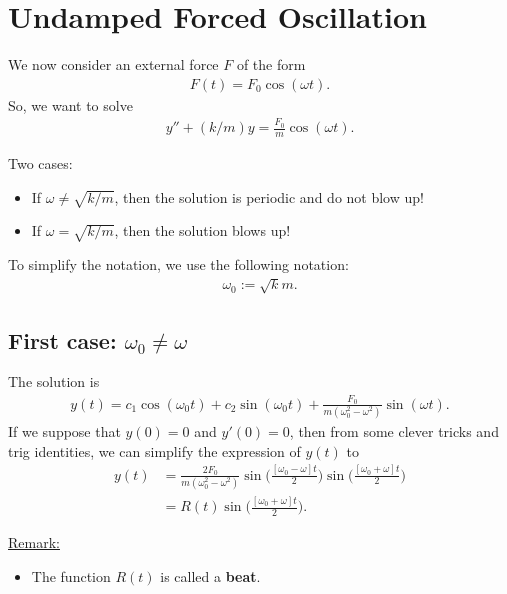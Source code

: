 \documentclass[12pt,a4paper]{article}
\begin{document}
\newpage

\section{Undamped Forced Oscillation}
We now consider an external force $F$ of the form
	\begin{align*}
	F(t) = F_0 \cos (\omega t ) .
	\end{align*}
So, we want to solve
	\begin{align*}
	y'' + (k/m) y = \frac{F_0}{m} \cos (\omega t) .
	\end{align*}

Two cases:
	\begin{itemize}
	\item If $\omega \neq \sqrt{k/m}$, then the solution is periodic and do not blow up!
	\item If $\omega = \sqrt{k/m}$, then the solution blows up!
	\end{itemize}

To simplify the notation, we use the following notation:
	\begin{align*}
	\omega_0 := \sqrt{k}{m} .
	\end{align*}
	
\subsection{First case: $\omega_0 \neq \omega$}
The solution is
	\begin{align*}
	y(t) = c_1 \cos (\omega_0 t) + c_2 \sin (\omega_0 t) + \frac{F_0}{m (\omega_0^2 - \omega^2 )} \sin (\omega t) .
	\end{align*}
If we suppose that $y(0) = 0$ and $y'(0) = 0$, then from some clever tricks and trig identities, we can simplify the expression of $y(t)$ to
	\begin{align*}
	y(t) &= \frac{2 F_0}{m (\omega_0^2 - \omega^2)} \sin \Big( \frac{[\omega_0 - \omega ] t}{2} \Big) \sin \Big( \frac{[\omega_0 + \omega] t}{2} \Big) \\
	&= R(t) \sin \Big( \frac{[\omega_0 + \omega ]t}{2} \Big) .
	\end{align*}

\underline{Remark:}
	\begin{itemize}
	\item The function $R(t)$ is called a \textbf{beat}.
	\end{itemize}
\end{document}
